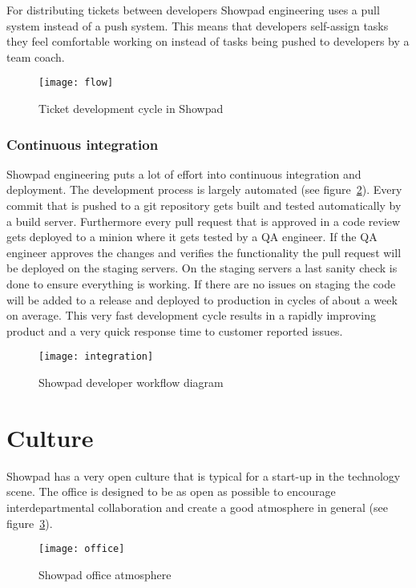 For distributing tickets between developers Showpad engineering uses a pull system instead of a push system. This means that developers self-assign tasks they feel comfortable working on instead of tasks being pushed to developers by a team coach.

\begin{figure}[H]
	\centering
	\texttt{[image: flow]}
	\caption{Ticket development cycle in Showpad}
	\label{figure:flow}
\end{figure}

\subsubsection{Continuous integration}

Showpad engineering puts a lot of effort into continuous integration and deployment. The development process is largely automated (see figure~\ref{figure:workflow}). Every commit that is pushed to a git repository gets built and tested automatically by a build server. Furthermore every pull request that is approved in a code review gets deployed to a minion where it gets tested by a QA engineer. If the QA engineer approves the changes and verifies the functionality the pull request will be deployed on the staging servers. On the staging servers a last sanity check is done to ensure everything is working. If there are no issues on staging the code will be added to a release and deployed to production in cycles of about a week on average. This very fast development cycle results in a rapidly improving product and a very quick response time to customer reported issues.

\begin{figure}[H]
	\centering
	\texttt{[image: integration]}
	\caption{Showpad developer workflow diagram}
	\label{figure:workflow}
\end{figure}

\section{Culture}

Showpad has a very open culture that is typical for a start-up in the technology scene. The office is designed to be as open as possible to encourage interdepartmental collaboration and create a good atmosphere in general (see figure~\ref{figure:office}).

\begin{figure}[H]
	\centering
	\texttt{[image: office]}
	\caption{Showpad office atmosphere}
	\label{figure:office}
\end{figure}

